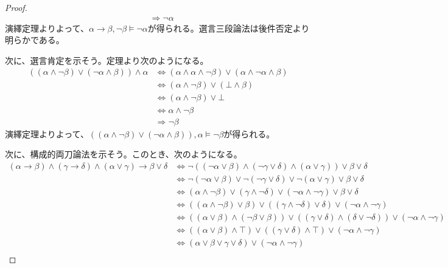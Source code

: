 \documentclass[a4paper]{jsarticle}
\begin{document}
\begin{proof}
\begin{align*}
&\Rightarrow \neg\alpha
\end{align*}
演繹定理よりよって、$\alpha \rightarrow \beta,\neg\beta \vDash \neg\alpha$が得られる。選言三段論法は後件否定より明らかである。\par
次に、選言肯定を示そう。定理より次のようになる。
\begin{align*}
\left( (\alpha \land \neg\beta) \vee (\neg\alpha \land \beta) \right) \land \alpha &\Leftrightarrow (\alpha \land \alpha \land \neg\beta) \vee (\alpha \land \neg\alpha \land \beta) \\
&\Leftrightarrow (\alpha \land \neg\beta) \vee (\bot \land \beta) \\ 
&\Leftrightarrow (\alpha \land \neg\beta) \vee \bot \\
&\Leftrightarrow \alpha \land \neg\beta \\
&\Rightarrow \neg\beta
\end{align*}
演繹定理よりよって、$\left( (\alpha \land \neg\beta) \vee (\neg\alpha \land \beta) \right),\alpha \vDash \neg\beta$が得られる。\par
次に、構成的両刀論法を示そう。このとき、次のようになる。
\begin{align*}
(\alpha \rightarrow \beta) \land (\gamma \rightarrow \delta) \land (\alpha \vee \gamma) \rightarrow \beta \vee \delta &\Leftrightarrow \neg\left( (\neg\alpha \vee \beta) \land (\neg\gamma \vee \delta) \land (\alpha \vee \gamma) \right) \vee \beta \vee \delta \\
&\Leftrightarrow \neg(\neg\alpha \vee \beta) \vee \neg(\neg\gamma \vee \delta) \vee \neg(\alpha \vee \gamma) \vee \beta \vee \delta \\
&\Leftrightarrow (\alpha \land \neg\beta) \vee (\gamma \land \neg\delta) \vee (\neg\alpha \land \neg\gamma) \vee \beta \vee \delta \\
&\Leftrightarrow \left( (\alpha \land \neg\beta) \vee \beta \right) \vee \left( (\gamma \land \neg\delta) \vee \delta \right) \vee (\neg\alpha \land \neg\gamma) \\
&\Leftrightarrow \left( (\alpha \vee \beta) \land (\neg\beta \vee \beta) \right) \vee \left( (\gamma \vee \delta) \land (\delta \vee \neg\delta) \right) \vee (\neg\alpha \land \neg\gamma) \\
&\Leftrightarrow \left( (\alpha \vee \beta) \land \top \right) \vee \left( (\gamma \vee \delta) \land \top \right) \vee (\neg\alpha \land \neg\gamma) \\
&\Leftrightarrow (\alpha \vee \beta \vee \gamma \vee \delta) \vee (\neg\alpha \land \neg\gamma) \\

\end{align*}
\end{proof}
\end{document}

